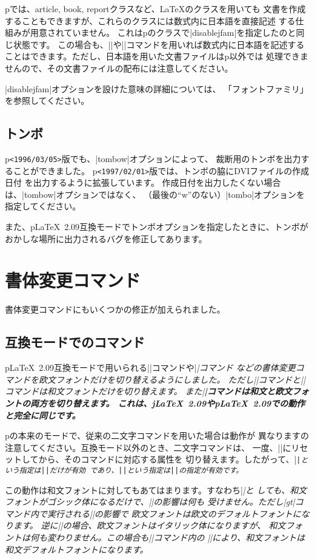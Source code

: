 \documentclass{plnews}
\begin{document}
p\LaTeXe{}では、article, book, reportクラスなど、\LaTeX{}のクラスを用いても
文書を作成することもできますが、これらのクラスには数式内に日本語を直接記述
する仕組みが用意されていません。
これはp\LaTeXe{}のクラスで|disablejfam|を指定したのと同じ状態です。
この場合も、|\textmc|や|\textgt|コマンドを用いれば数式内に日本語を記述する
ことはできます。ただし、日本語を用いた文書ファイルはp\LaTeXe{}以外では
処理できませんので、その文書ファイルの配布には注意してください。

|disablejfam|オプションを設けた意味の詳細については、
「フォントファミリ」を参照してください。

\subsection{トンボ}
p\LaTeXe{}\texttt{<1996/03/05>}版でも、|tombow|オプションによって、
裁断用のトンボを出力することができました。
p\LaTeXe{}\texttt{<1997/02/01>}版では、トンボの脇にDVIファイルの作成日付
を出力するように拡張しています。
作成日付を出力したくない場合は、|tombow|オプションではなく、
（最後の``w''のない）|tombo|オプションを指定してください。

また、p\LaTeX~2.09互換モードでトンボオプションを指定したときに、トンボが
おかしな場所に出力されるバグを修正してあります。


\section{書体変更コマンド}
書体変更コマンドにもいくつかの修正が加えられました。

\subsection{互換モードでのコマンド}
p\LaTeX~2.09互換モードで用いられる|\rm|コマンドや|\it|コマンド
などの書体変更コマンドを欧文フォントだけを切り替えるようにしました。
ただし|\mc|コマンドと|\gt|コマンドは和文フォントだけを切り替えます。
また|\bf|コマンドは和文と欧文フォントの両方を切り替えます。
これは、j\LaTeX~2.09やp\LaTeX~2.09での動作と完全に同じです。

p\LaTeXe{}の本来のモードで、従来の二文字コマンドを用いた場合は動作が
異なりますの 注意してください。互換モード以外のとき、二文字コマンドは、
一度、|\normalfont|にリセットしてから、そのコマンドに対応する属性を
切り替えます。したがって、|\it\tt|という指定は|\tt|だけが有効
であり、|\tt\it|という指定は|\it|の指定が有効です。

この動作は和文フォントに対してもあてはまります。すなわち|\it\gt|と
しても、和文フォントがゴシック体になるだけで、|\it|の影響は何も
受けません。ただし|gt|コマンド内で実行される|\normalfont|の影響で
欧文フォントは欧文のデフォルトフォントになります。
逆に|\gt\it|の場合、欧文フォントはイタリック体になりますが、
和文フォントは何も変わりません。この場合も|\it|コマンド内の
|\normalfont|により、和文フォントは和文デフォルトフォントになります。
\end{document}
